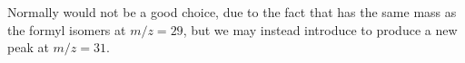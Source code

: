 Normally  would not be a good choice, due to the fact that  has the same mass as the formyl isomers at $m/z=29$, but we may instead introduce  to produce a new peak at $m/z=31$.

